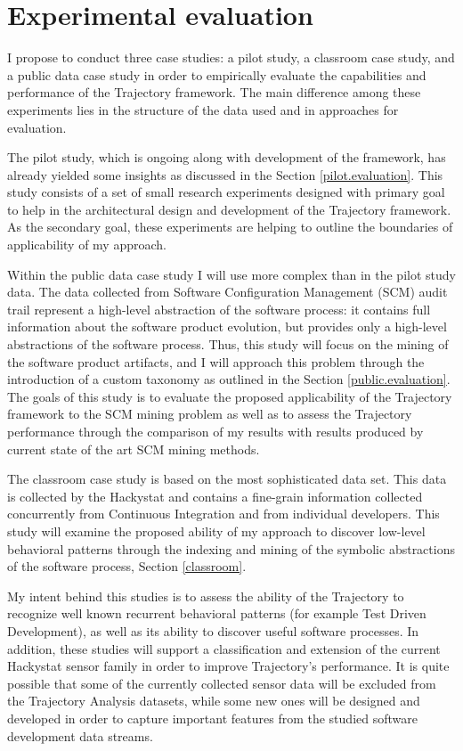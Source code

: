 \chapter{Experimental evaluation} \label{experiments}
I propose to conduct three case studies: a pilot study, a classroom case study, and a public data case study in order to empirically evaluate the capabilities and performance of the Trajectory framework. The main difference among these experiments lies in the structure of the data used and in approaches for evaluation. 

The pilot study, which is ongoing along with development of the framework, has already yielded some insights as discussed in the Section \ref{pilot.evaluation}. This study consists of a set of small research experiments designed with primary goal to help in the architectural design and development of the Trajectory framework. As the secondary goal, these experiments are helping to outline the boundaries of applicability of my approach.

Within the public data case study I will use more complex than in the pilot study data. The data collected from Software Configuration Management (SCM) audit trail represent a high-level abstraction of the software process: it contains full information about the software product evolution, but provides only a high-level abstractions of the software process. Thus, this study will focus on the mining of the software product artifacts, and I will approach this problem through the introduction of a custom taxonomy as outlined in the Section \ref{public.evaluation}. The goals of this study is to evaluate the proposed applicability of the Trajectory framework to the SCM mining problem as well as to assess the Trajectory performance through the comparison of my results with results produced by current state of the art SCM mining methods.

The classroom case study is based on the most sophisticated data set. This data is collected by the Hackystat and contains a fine-grain information collected concurrently from Continuous Integration and from individual developers. This study will examine the proposed ability of my approach to discover low-level behavioral patterns through the indexing and mining of the symbolic abstractions of the software process, Section \ref{classroom}. 

My intent behind this studies is to assess the ability of the Trajectory to recognize well known recurrent behavioral patterns (for example Test Driven Development), as well as its ability to discover useful software processes. In addition, these studies will support a classification and extension of the current Hackystat sensor family in order to improve Trajectory's performance. It is quite possible that some of the currently collected sensor data will be excluded from the Trajectory Analysis datasets, while some new ones will be designed and developed in order to capture important features from the studied software development data streams.

